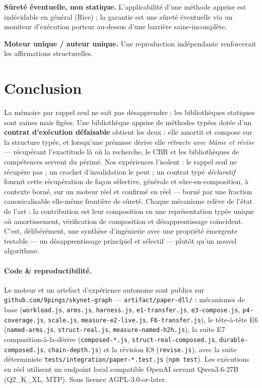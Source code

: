 \documentclass[11pt]{article}
\begin{document}
\textbf{Sûreté éventuelle, non statique.} L'applicabilité d'une méthode apprise est indécidable en général (Rice) ;
la garantie est une sûreté éventuelle via un moniteur d'exécution porteur au-dessus d'une barrière saine-incomplète.

\textbf{Moteur unique / auteur unique.} Une reproduction indépendante renforcerait les affirmations structurelles.

\section{Conclusion}
La mémoire par rappel seul ne sait pas désapprendre ; les bibliothèques statiques sont saines mais figées. Une
bibliothèque apprise de méthodes typées dotée d'un \textbf{contrat d'exécution défaisable} obtient les deux : elle
amortit et compose sur la structure typée, et lorsqu'une prémisse dérive elle \emph{rétracte avec blâme et révise}
--- récupérant l'exactitude là où la recherche, le CBR et les bibliothèques de compétences servent du périmé. Nos
expériences l'isolent : le rappel seul ne récupère pas ; un crochet d'invalidation le peut ; un contrat typé
\emph{déclaratif} fournit cette récupération de façon sélective, générale et sûre-en-composition, à contexte borné,
sur un moteur réel et confirmé en réel --- borné par une fraction canonicalisable elle-même frontière de sûreté.
Chaque mécanisme relève de l'état de l'art ; la contribution est leur composition en une représentation typée
unique où amortissement, vérification de composition et désapprentissage coïncident. C'est, délibérément, une
synthèse d'ingénierie avec une propriété émergente testable --- un désapprentissage principiel et sélectif ---
plutôt qu'un nouvel algorithme.

\paragraph{Code \& reproductibilité.} Le moteur et un artefact d'expérience autonome sont publics sur
\texttt{github.com/9pings/skynet-graph} --- \texttt{artifact/paper-dll/} : mécanismes de base
(\texttt{workload.js}, \texttt{arms.js}, \texttt{harness.js}, \texttt{e1-transfer.js}, \texttt{e3-compose.js},
\texttt{p4-coverage.js}, \texttt{scale.js}, \texttt{measure-e2-live.js}, \texttt{F6-transfer.js}), le tête-à-tête
E6 (\texttt{named-arms.js}, \texttt{struct-real.js}, \texttt{measure-named-h2h.js}), la suite E7
composition-à-la-dérive (\texttt{composed-*.js}, \texttt{struct-real-composed.js}, \texttt{durable-composed.js},
\texttt{chain-depth.js}) et la révision E8 (\texttt{revise.js}), avec la suite déterministe
\texttt{tests/integration/paper-*.test.js} (\texttt{npm test}). Les exécutions en réel utilisent un endpoint local
compatible OpenAI servant Qwen3.6-27B (Q2\_K\_XL, MTP). Sous licence AGPL-3.0-or-later.
\end{document}
